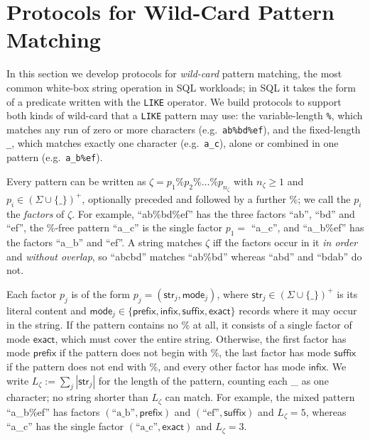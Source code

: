 \doclearpage
\section{Protocols for Wild-Card Pattern Matching}
\label{sec:piop-for-pattern-matching}

In this section we develop protocols for \emph{wild-card} pattern matching, the most common white-box string operation in SQL workloads; in SQL it takes the form of a predicate written with the \texttt{LIKE} operator.
We build protocols to support both kinds of wild-card that a \texttt{LIKE} pattern may use: the variable-length \texttt{\%}, which matches any run of zero or more characters (e.g.\ \texttt{ab\%bd\%ef}), and the fixed-length \texttt{\_}, which matches exactly one character (e.g.\ \texttt{a\_c}), alone or combined in one pattern (e.g.\ \texttt{a\_b\%ef}).

 Every pattern can be written as $\zeta = p_1 \% p_2 \% \dots \% p_{n_\zeta}$ with $n_\zeta \ge 1$ and $p_i \in (\Sigma \cup \{\text{\_}\})^{+}$, optionally preceded and followed by a further \%; we call the $p_i$ the \emph{factors} of $\zeta$. For example, ``ab\%bd\%ef'' has the three factors ``ab'', ``bd'' and ``ef'', the \%-free pattern ``a\_c'' is the single factor $p_1 = $ ``a\_c'', and ``a\_b\%ef'' has the factors ``a\_b'' and ``ef''.
A string matches $\zeta$ iff the factors occur in it \emph{in order} and \emph{without overlap}, so ``abcbd'' matches ``ab\%bd'' whereas ``abd'' and ``bdab'' do not.

 Each factor $p_j$ is of the form $p_j=(\mathsf{str}_j,\mathsf{mode}_j)$, where $\mathsf{str}_j\in(\Sigma\cup\{\text{\_}\})^{+}$ is its literal content and $\mathsf{mode}_j\in\{\mathsf{prefix},\mathsf{infix},\mathsf{suffix},\mathsf{exact}\}$ records where it may occur in the string. If the pattern contains no \% at all, it consists of a single factor of mode $\mathsf{exact}$, which must cover the entire string. Otherwise, the first factor has mode $\mathsf{prefix}$ if the pattern does not begin with \%, the last factor has mode $\mathsf{suffix}$ if the pattern does not end with \%, and every other factor has mode $\mathsf{infix}$. We write $L_\zeta:=\sum_{j}|\mathsf{str}_j|$ for the length of the pattern, counting each \_ as one character; no string shorter than $L_\zeta$ can match. For example, the mixed pattern ``a\_b\%ef'' has factors $(\text{``a\_b''},\mathsf{prefix})$ and $(\text{``ef''},\mathsf{suffix})$ and $L_\zeta=5$, whereas ``a\_c'' has the single factor $(\text{``a\_c''},\mathsf{exact})$ and $L_\zeta=3$.

